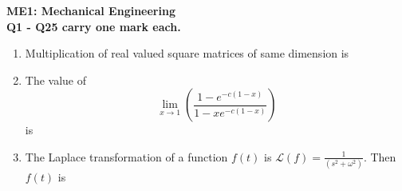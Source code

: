 \documentclass[12pt,onecolumn]{article}
\begin{document}
\noindent\large\textbf{ME1: Mechanical Engineering}\\
\normalsize\textbf{Q1 - Q25 carry one mark each.}
\begin{enumerate}
    \item Multiplication of real valued square matrices of same dimension is
          \begin{enumerate}
          \end{enumerate}

    \item The value of
          \[
              \lim_{x\to1} \left( \frac{1-e^{-c(1-x)}}{1-xe^{-c(1-x)}} \right)
          \] is
          \begin{enumerate}
          \end{enumerate}

    \item The Laplace transformation of a function $f(t)$ is $\mathcal{L}(f)=\frac{1}{(s^2+\omega^2)}$. Then $f(t)$ is
          \begin{enumerate}
          \end{enumerate}


\end{enumerate}
\end{document}
